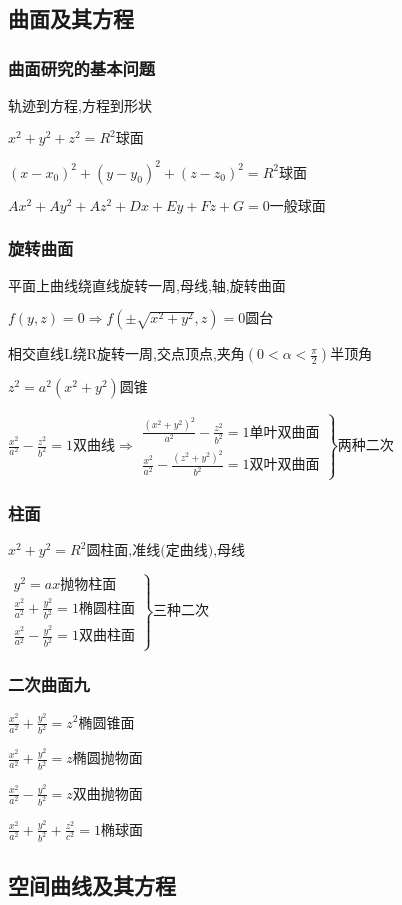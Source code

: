 \documentclass[UTF8]{ctexart}
\newcommand{\mt}[1]{\text{#1}}
\newcommand{\mf}[1]{\left( #1\right)}
\newcommand{\p}{\par}
\newcommand{\ma}[1]{\begin{array}{llll} #1 \end{array}}
\begin{document}
\subsection{曲面及其方程}

\subsubsection{曲面研究的基本问题}

轨迹到方程,方程到形状\p
$x^2+y^2+z^2=R^2\mt{球面}$\p
$\mf{x-x_0}^2+\mf{y-y_0}^2+\mf{z-z_0}^2=R^2\mt{球面}$\p
$Ax^2+Ay^2+Az^2+Dx+Ey+Fz+G=0\mt{一般球面}$

\subsubsection{旋转曲面}
平面上曲线绕直线旋转一周,母线,轴,旋转曲面\p
$f\mf{y,z}=0 \Rightarrow f\mf{\pm \sqrt{x^2+y^2},z}=0\mt{圆台}$\p

相交直线L绕R旋转一周,交点顶点,夹角$\mf{0<\alpha<\frac{\pi}{2}}$半顶角\p
$z^2=a^2\mf{x^2+y^2}\mt{圆锥}$\p
$\frac{x^2}{a^2}-\frac{z^2}{b^2}=1\mt{双曲线} \Rightarrow \left.\ma{
    \frac{\mf{x^2+y^2}^2}{a^2}-\frac{z^2}{b^2}=1\mt{单叶双曲面}\\
    \frac{x^2}{a^2}-\frac{\mf{z^2+y^2}^2}{b^2}=1\mt{双叶双曲面}
}\right\}\mt{两种二次}$

\subsubsection{柱面}
$x^2+y^2=R^2\mt{圆柱面,准线(定曲线),母线}$\p
$\left.\ma{y^2=ax\mt{抛物柱面}\\
\frac{x^2}{a^2}+\frac{y^2}{b^2}=1\mt{椭圆柱面}\\
\frac{x^2}{a^2}-\frac{y^2}{b^2}=1\mt{双曲柱面}}\right\}\mt{三种二次}$


\subsubsection{二次曲面九}

$\frac{x^2}{a^2}+\frac{y^2}{b^2}=z^2\mt{椭圆锥面}$\p
$\frac{x^2}{a^2}+\frac{y^2}{b^2}=z\mt{椭圆抛物面}$\p
$\frac{x^2}{a^2}-\frac{y^2}{b^2}=z\mt{双曲抛物面}$\p
$\frac{x^2}{a^2}+\frac{y^2}{b^2}+\frac{z^2}{c^2}=1\mt{椭球面}$\p



\subsection{空间曲线及其方程}
\end{document}
